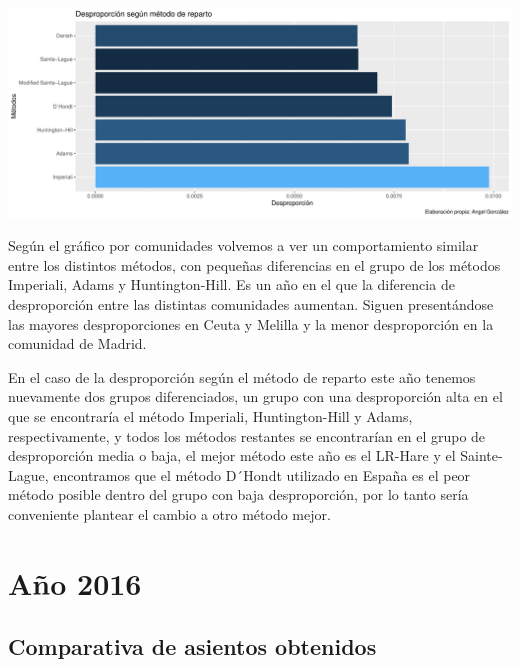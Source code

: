 \documentclass[12pt,a4paper,]{book}
\numberwithin{dummy}{section}
\theoremstyle{ocrenumbox}
\theoremstyle{blacknumex}
\theoremstyle{blacknumbox}
\theoremstyle{ocrenum}
\theoremstyle{ocrenum}
\begin{document}
\begin{center}\includegraphics[width=1\linewidth]{figurasR/unnamed-chunk-39-2} \end{center}

Según el gráfico por comunidades volvemos a ver un comportamiento
similar entre los distintos métodos, con pequeñas diferencias en el
grupo de los métodos Imperiali, Adams y Huntington-Hill. Es un año en el
que la diferencia de desproporción entre las distintas comunidades
aumentan. Siguen presentándose las mayores desproporciones en Ceuta y
Melilla y la menor desproporción en la comunidad de Madrid.

En el caso de la desproporción según el método de reparto este año
tenemos nuevamente dos grupos diferenciados, un grupo con una
desproporción alta en el que se encontraría el método Imperiali,
Huntington-Hill y Adams, respectivamente, y todos los métodos restantes
se encontrarían en el grupo de desproporción media o baja, el mejor
método este año es el LR-Hare y el Sainte-Lague, encontramos que el
método D´Hondt utilizado en España es el peor método posible dentro del
grupo con baja desproporción, por lo tanto sería conveniente plantear el
cambio a otro método mejor.

\hypertarget{auxf1o-2016}{%
\section{Año 2016}\label{auxf1o-2016}}

\hypertarget{comparativa-de-asientos-obtenidos-12}{%
\subsection{Comparativa de asientos
obtenidos}\label{comparativa-de-asientos-obtenidos-12}}
\end{document}
